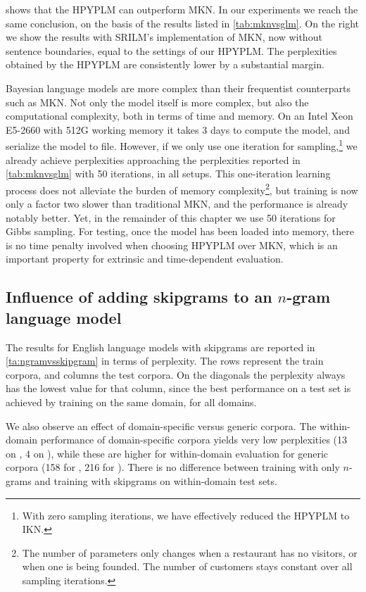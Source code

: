 \cite{teh2006hierarchical} shows that the HPYPLM can outperform MKN. In our experiments we reach the same conclusion, on the basis of the results listed in \cref{tab:mknvsglm}. On the right we show the results with SRILM's implementation of MKN, now without sentence boundaries, equal to the settings of our HPYPLM. The perplexities obtained by the HPYPLM are consistently lower by a substantial margin.

Bayesian language models are more complex than their frequentist counterparts such as MKN. Not only the model itself is more complex, but also the computational complexity, both in terms of time and memory. On an Intel Xeon E5-2660 with 512G working memory it takes 3 days to compute the \obw model, and serialize the model to file. However, if we only use one iteration for sampling,\footnote{With zero sampling iterations, we have effectively reduced the HPYPLM to IKN.} we already achieve perplexities approaching the perplexities reported in \cref{tab:mknvsglm} with 50 iterations, in all setups. This one-iteration learning process does not alleviate the burden of memory complexity\footnote{The number of parameters only changes when a restaurant has no visitors, or when one is being founded. The number of customers stays constant over all sampling iterations.}, but training is now only a factor two slower than traditional MKN, and the performance is already notably better.
Yet, in the remainder of this chapter we use 50 iterations for Gibbs sampling. For testing, once the model has been loaded into memory, there is no time penalty involved when choosing HPYPLM over MKN, which is an important property for extrinsic and time-dependent evaluation.

\subsection{Influence of adding skipgrams to an $n$-gram language model}
The results for English language models with skipgrams are reported in \cref{ta:ngramvsskipgram} in terms of perplexity. The rows represent the train corpora, and columns the test corpora. On the diagonals the perplexity always has the lowest value for that column, since the best performance on a test set is achieved by training on the same domain, for all domains. 

We also observe an effect of domain-specific versus generic corpora. The within-domain performance of domain-specific corpora yields very low perplexities (13 on \jrc, 4 on \emea), while these are higher for within-domain evaluation for generic corpora (158 for \obw, 216 for \wp). There is no difference between training with only $n$-grams and training with skipgrams on within-domain test sets.

